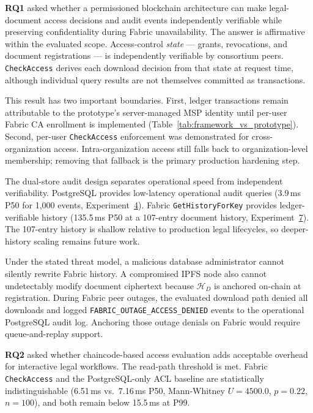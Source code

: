 \documentclass{ieeeaccess}
\begin{document}
\textbf{RQ1} asked whether a permissioned blockchain architecture can make
legal-document access decisions and audit events independently verifiable
while preserving confidentiality during Fabric unavailability. The answer is
affirmative within the evaluated scope. Access-control \emph{state} ---
grants, revocations, and document registrations --- is independently
verifiable by consortium peers. \texttt{CheckAccess} derives each download
decision from that state at request time, although individual query results
are not themselves committed as transactions.

This result has two important boundaries. First, ledger transactions remain
attributable to the prototype's server-managed MSP identity until per-user
Fabric CA enrollment is implemented (Table~\ref{tab:framework_vs_prototype}).
Second, per-user \texttt{CheckAccess} enforcement was demonstrated for
cross-organization access. Intra-organization access still falls back to
organization-level membership; removing that fallback is the primary
production hardening step.

The dual-store audit design separates operational speed from independent
verifiability. PostgreSQL provides low-latency operational audit queries
(3.9\,ms P50 for 1,000 events, Experiment~\hyperref[sec:exp_audit]{4}). Fabric
\texttt{GetHistoryForKey} provides ledger-verifiable history (135.5\,ms P50
at a 107-entry document history, Experiment~\hyperref[sec:exp_gethistory]{7}).
The 107-entry history is shallow relative to production legal lifecycles, so
deeper-history scaling remains future work.

Under the stated threat model, a malicious database administrator cannot
silently rewrite Fabric history. A compromised IPFS node also cannot
undetectably modify document ciphertext because $\mathcal{H}_D$ is anchored
on-chain at registration. During Fabric peer outages, the evaluated download
path denied all downloads and logged \texttt{FABRIC\_OUTAGE\_ACCESS\_DENIED}
events to the operational \mbox{PostgreSQL} audit log. Anchoring those outage
denials on Fabric would require queue-and-replay support.

\textbf{RQ2} asked whether chaincode-based access evaluation adds acceptable
overhead for interactive legal workflows. The read-path threshold is met.
Fabric \texttt{CheckAccess} and the PostgreSQL-only ACL baseline are
statistically indistinguishable (6.51\,ms vs.\ 7.16\,ms P50, Mann-Whitney
$U{=}4500.0$, $p{=}0.22$, $n{=}100$), and both remain below 15.5\,ms at P99.
\end{document}
